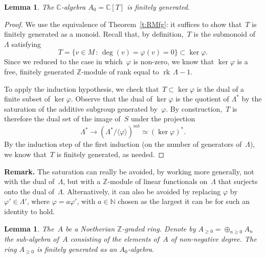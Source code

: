 \documentclass[english]{amsart}
\newcommand{\C}{\mathbb{C}}
\newcommand{\N}{\mathbb{N}}
\newcommand{\Z}{\mathbb{Z}}
\newcommand{\Az}{A_{\geq0}}
\DeclareMathOperator{\rk}{rk\,}
\newtheorem{lemma}[theorem]{Lemma}
\begin{document}
\begin{lemma}
The $\C$-algebra $A_0 = \C[T]$ is finitely generated.
\end{lemma}
\begin{proof}
We use the equivalence of Theorem~\ref{t:RMfg}: it suffices to show that~$T$ is finitely generated as a monoid.  Recall that, by definition,~$T$ is the submonoid of~$\Lambda$ satisfying
\[
T=\{v \in M \,:\, \deg(v) = \varphi (v) = 0\} \subset \ker \varphi .
\]
Since we reduced to the case in which~$\varphi$ is non-zero, we know that $\ker \varphi$ is a free, finitely generated $\Z$-module of rank equal to ${\rk} \Lambda - 1$.

To apply the induction hypothesis, we check that~$T \subset \ker \varphi$ is the dual of a finite subset of $\ker \varphi$.  Observe that the dual of $\ker \varphi$ is the quotient of $\Lambda^*$ by the saturation of the additive subgroup generated by~$\varphi$.  By construction,~$T$ is therefore the dual set of the image of~$S$ under the projection
\[
\Lambda^* \to \left( \Lambda^* / \langle \varphi \rangle \right)^{\textrm{sat}} \simeq \left( \ker \varphi \right)^*.
\]
By the induction step of the first induction (on the number of generators of~$\Lambda$), we know that~$T$ is finitely generated, as needed.
\end{proof}


\noindent
{\textbf{Remark.}}
The saturation can really be avoided, by working more generally, not with the dual of~$\Lambda$, but with a $\Z$-module of linear functionals on~$\Lambda$ that surjects onto the dual of~$\Lambda$.  Alternatively, it can also be avoided by replacing $\varphi$ by $\varphi' \in \Lambda'$, where $\varphi = a \varphi'$, with $a \in \N$ chosen as the largest it can be for such an identity to hold.


\begin{lemma}
The~$A$ be a Noetherian $\Z$-graded ring.  Denote by $\Az = \oplus_{n \geq 0} A_n$ the sub-algebra of~$A$ consisting of the elements of~$A$ of non-negative degree.  The ring $\Az$ is finitely generated as an $A_0$-algebra.
\end{lemma}
\end{document}
